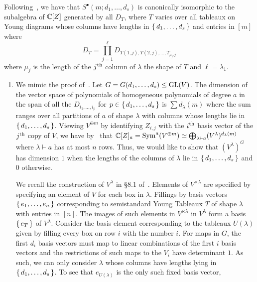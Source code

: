 \documentclass[letterpaper, 11pt, oneside]{book}
\begin{document}
\begin{sol}\label{ex:YT_9.1.4}
  Following~\cite[Corollary of Theorem 1, \S 8.1]{book:YT}, we have that $S^{\bullet}(m; d_{1}, \ldots, d_{s})$ is canonically isomorphic to the subalgebra of $\mathbb{C}[Z]$ generated by all $D_{T}$, where $T$ varies over all tableaux on Young diagrams whose columns have lengths in $\set{d_{1}, \ldots, d_{s}}$ and entries in $[m]$ where
  \[
    D_{T} = \prod_{j = 1}^{\ell} D_{T(1, j), T(2, j), \ldots, T_{\mu_{j}, j}}
  \]
  where $\mu_{j}$ is the length of the $j\textsuperscript{th}$ column of $\lambda$ the shape of $T$ and $\ell = \lambda_{1}$.
  \begin{enumerate}[label=(\alph*)]
    \item We mimic the proof of~\cite[Proposition 2, \S 9.1]{book:YT}.
          Let $G = G(d_{1}, \ldots, d_{s}) \leq \operatorname{GL}(V)$.
          The dimension of the vector space of polynomials of homogeneous polynomials of degree $a$ in the span of all the $D_{i_{1}, \ldots, i_{p}}$ for $p \in \set{d_{1}, \ldots, d_{s}}$ is $\sum d_{\lambda}(m)$ where the sum ranges over all partitions of $a$ of shape $\lambda$ with columns whose lengths lie in $\set{d_{1}, \ldots, d_{s}}$.
          Viewing $V^{\oplus m}$ by identifying $Z_{i, j}$ with the $i\textsuperscript{th}$ basis vector of the $j\textsuperscript{th}$ copy of $V$, we have by~\cite[Corollary 3(a), \S 8.3]{book:YT} that $\mathbb{C}[Z]_{a} = \operatorname{Sym}^{a}(V^{\oplus m}) \simeq \bigoplus_{\lambda \vdash a} (V^{\lambda})^{d_{\lambda}(m)}$ where $\lambda \vdash a$ has at most $n$ rows.
          Thus, we would like to show that $(V^{\lambda})^{G}$ has dimension $1$ when the lengths of the columns of $\lambda$ lie in $\set{d_{1}, \ldots, d_{s}}$ and $0$ otherwise.

          We recall the construction of $V^{\lambda}$ in \S 8.1 of~\cite{book:YT}.
          Elements of $V^{\times \lambda}$ are specified by specifying an element of $V$ for each box in $\lambda$.
          Fillings by basis vectors $\set{e_{1}, \ldots, e_{n}}$ corresponding to semistandard Young Tableaux $T$ of shape $\lambda$ with entries in $[n]$.
          The images of such elements in $V^{\times \lambda}$ in $V^{\lambda}$ form a basis $\set{e_{T}}$ of $V^{\lambda}$.
          Consider the basis element corresponding to the tableaux $U(\lambda)$ given by filling every box on row $i$ with the number $i$.
          For maps in $G$, the first $d_{i}$ basis vectors must map to linear combinations of the first $i$ basis vectors and the restrictions of such maps to the $V_{i}$ have determinant $1$.
          As such, we can only consider $\lambda$ whose columns have lengths lying in $\set{d_{1}, \ldots, d_{s}}$.
          To see that $e_{U(\lambda)}$ is the only such fixed basis vector,


\end{enumerate}
\end{sol}
\end{document}
